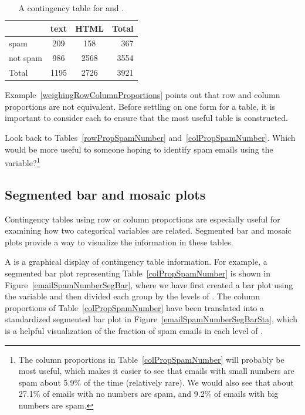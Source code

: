 \begin{table}[ht]
\centering
\begin{tabular}{l cc r}
  \hline
 & text & HTML & Total \\ 
  \hline
spam & 209 & 158 & 367 \\ 
not spam & 986 & 2568 & 3554 \\ 
   \hline
Total & 1195 & 2726 & 3921 \\
   \hline
\end{tabular}
\caption{A contingency table for  and .}
\label{emailSpamHTMLTableTotals}
\end{table}

Example~\ref{weighingRowColumnProportions} points out that row and column proportions are not equivalent. Before settling on one form for a table, it is important to consider each to ensure that the most useful table is constructed.

\begin{exercise}
Look back to Tables~\ref{rowPropSpamNumber} and~\ref{colPropSpamNumber}. Which would be more useful to someone hoping to identify spam emails using the  variable?\footnote{The column proportions in Table~\ref{colPropSpamNumber} will probably be most useful, which makes it easier to see that emails with small numbers are spam about 5.9\% of the time (relatively rare). We would also see that about 27.1\% of emails with no numbers are spam, and 9.2\% of emails with big numbers are spam.}
\end{exercise}


\textC{\newpage}

\subsection{Segmented bar and mosaic plots}
\label{segmentedBarPlotsAndIndependence}

Contingency tables using row or column proportions are especially useful for examining how two categorical variables are related. Segmented bar and mosaic plots provide a way to visualize the information in these tables.

A  is a graphical display of contingency table information. For example, a segmented bar plot representing Table~\ref{colPropSpamNumber} is shown in Figure~\ref{emailSpamNumberSegBar}, where we have first created a bar plot using the  variable and then divided each group by the levels of . The column proportions of Table~\ref{colPropSpamNumber} have been translated into a standardized segmented bar plot in Figure~\ref{emailSpamNumberSegBarSta}, which is a helpful visualization of the fraction of spam emails in each level of .

